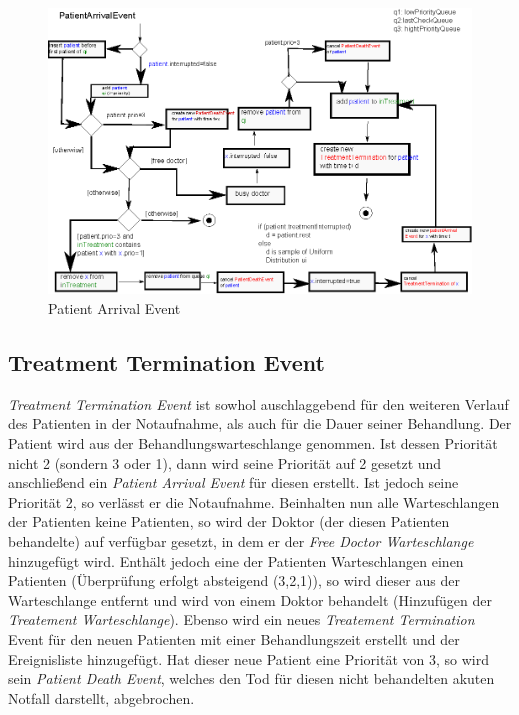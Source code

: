 \documentclass[12pt,fleqn,a4paper]{article}
\begin{document}
\begin{figure}[h]
	\centering
	\includegraphics{img/PatientArrivalEvent}
	\caption{Patient Arrival Event}
\end{figure}


\newpage

\subsection{Treatment Termination Event}
\textit{Treatment Termination Event} ist sowhol auschlaggebend f\"{u}r den weiteren Verlauf des Patienten in der Notaufnahme, als auch f\"{u}r die Dauer seiner Behandlung. Der Patient wird aus der Behandlungswarteschlange genommen. Ist dessen Priorit\"{a}t nicht 2 (sondern 3 oder 1), dann wird seine Priorit\"{a}t auf 2 gesetzt und anschlie\ss end ein \textit{Patient Arrival Event} f\"{u}r diesen erstellt. Ist jedoch seine Priorit\"{a}t 2, so verl\"{a}sst er die Notaufnahme.
Beinhalten nun alle Warteschlangen der Patienten keine Patienten, so wird der Doktor (der diesen Patienten behandelte) auf verf\"{u}gbar gesetzt, in dem er der \textit{Free Doctor Warteschlange} hinzugef\"{u}gt wird. Enth\"{a}lt jedoch eine der Patienten Warteschlangen einen Patienten (\"{U}berpr\"{u}fung erfolgt absteigend (3,2,1)),  so wird dieser aus der Warteschlange entfernt und wird von einem Doktor behandelt (Hinzuf\"{u}gen der \textit{Treatement Warteschlange}). Ebenso wird ein neues \textit{Treatement Termination} Event f\"{u}r den neuen Patienten mit einer Behandlungszeit erstellt und der Ereignisliste hinzugef\"{u}gt.
Hat dieser neue Patient eine Priorit\"{a}t von 3, so wird sein \textit{Patient Death Event}, welches den Tod f\"{u}r diesen nicht behandelten akuten Notfall darstellt, abgebrochen.
\end{document}

